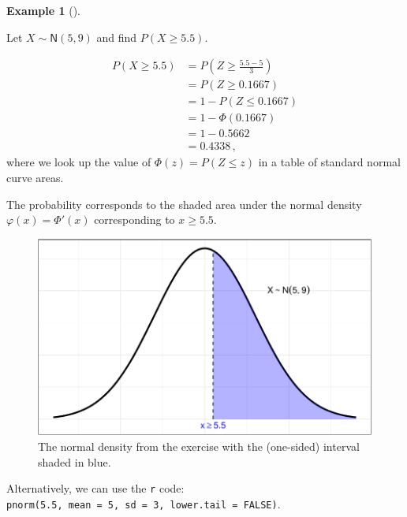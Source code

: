 \documentclass[
  a4paper,
  oneside]{book}
\theoremstyle{definition}
\theoremstyle{definition}
\newtheorem{example}{Example}[chapter]
\theoremstyle{definition}
\theoremstyle{plain}
\theoremstyle{remark}
\begin{document}
\begin{example}[]\protect\hypertarget{exm-norm-rt}{}\label{exm-norm-rt}

Let \(X \sim \mathsf{N}(5, 9)\) and find \(P(X \geq 5.5)\).

\[
\begin{aligned}
   P(X \geq 5.5) &= P\left(Z \geq \frac{5.5 - 5}{3}\right) \\
    &= P(Z \geq 0.1667) \\
    &= 1 - P(Z \leq 0.1667) \\
    &= 1 - \Phi(0.1667) \\
    &= 1 - 0.5662 \\
    &= 0.4338\,,
\end{aligned}
\] where we look up the value of \(\Phi(z) = P(Z\leq z)\) in a table of
standard normal curve areas.

The probability corresponds to the shaded area under the normal density
\(\varphi(x) = \Phi'(x)\) corresponding to \(x \geq 5.5\).

\begin{figure}[H]

{\centering \includegraphics{01-sampling-distributions_files/figure-pdf/example-norm-geq-1.pdf}

}

\caption{The normal density from the exercise with the (one-sided)
interval shaded in blue.}

\end{figure}%

Alternatively, we can use the \texttt{r} code:
\texttt{pnorm(5.5,\ mean\ =\ 5,\ sd\ =\ 3,\ lower.tail\ =\ FALSE)}.

\end{example}
\end{document}
